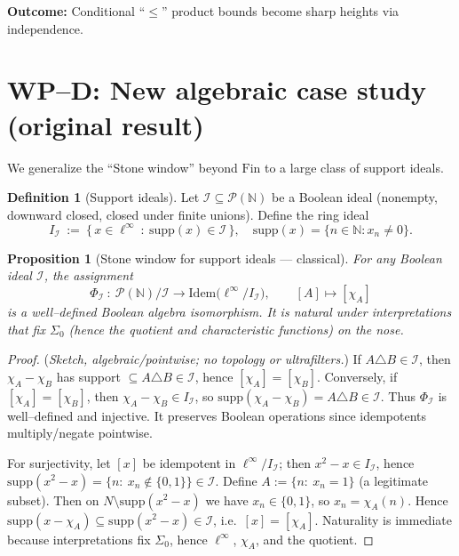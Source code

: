 \documentclass[11pt]{article}
\newtheorem{proposition}[theorem]{Proposition}
\theoremstyle{definition}
\newtheorem{definition}[theorem]{Definition}
\theoremstyle{remark}
\newcommand{\linf}{\ell^\infty}
\begin{document}
\textbf{Outcome:} Conditional ``$\leq$'' product bounds become sharp heights via independence.

\section{WP–D: New algebraic case study (original result)}

We generalize the “Stone window” beyond \(\mathrm{Fin}\) to a large class of support ideals.

\begin{definition}[Support ideals]
Let \(\mathcal I\subseteq \mathcal P(\mathbb N)\) be a Boolean ideal (nonempty, downward closed, closed under finite unions).
Define the ring ideal
\[
I_{\mathcal I}\ :=\ \{\,x\in \linf\ :\ \mathrm{supp}(x)\in\mathcal I\,\},
\quad
\mathrm{supp}(x)=\{n\in\mathbb N: x_n\neq 0\}.
\]
\end{definition}

\begin{proposition}[Stone window for support ideals — classical]\label{VI:prop:stone-general}
For any Boolean ideal \(\mathcal I\), the assignment
\[
\Phi_{\mathcal I}\ :\ \mathcal P(\mathbb N)/\mathcal I \longrightarrow \mathrm{Idem}\big(\linf/I_{\mathcal I}\big),
\qquad [A]\longmapsto[\chi_A]
\]
is a well–defined Boolean algebra isomorphism. It is natural under interpretations that fix \(\Sigma_0\) (hence the quotient and characteristic functions) on the nose.
\end{proposition}

\begin{proof}
(\emph{Sketch, algebraic/pointwise; no topology or ultrafilters.})
If \(A\triangle B\in\mathcal I\), then \(\chi_A-\chi_B\) has support \(\subseteq A\triangle B\in\mathcal I\), hence \([\chi_A]=[\chi_B]\).
Conversely, if \([\chi_A]=[\chi_B]\), then \(\chi_A-\chi_B\in I_{\mathcal I}\), so \(\mathrm{supp}(\chi_A-\chi_B)=A\triangle B\in\mathcal I\).
Thus \(\Phi_{\mathcal I}\) is well–defined and injective. It preserves Boolean operations since idempotents multiply/negate pointwise.

For surjectivity, let \([x]\) be idempotent in \(\linf/I_{\mathcal I}\); then \(x^2-x\in I_{\mathcal I}\), hence
\(\mathrm{supp}(x^2-x)=\{n:\ x_n\notin\{0,1\}\}\in\mathcal I\).
Define \(A:=\{n:\ x_n=1\}\) (a legitimate subset). Then on \(N\setminus \mathrm{supp}(x^2-x)\) we have \(x_n\in\{0,1\}\), so \(x_n=\chi_A(n)\).
Hence \(\mathrm{supp}(x-\chi_A)\subseteq \mathrm{supp}(x^2-x)\in\mathcal I\), i.e.\ \([x]=[\chi_A]\). Naturality is immediate because interpretations fix \(\Sigma_0\), hence \(\linf\), \(\chi_A\), and the quotient.
\end{proof}
\end{document}
